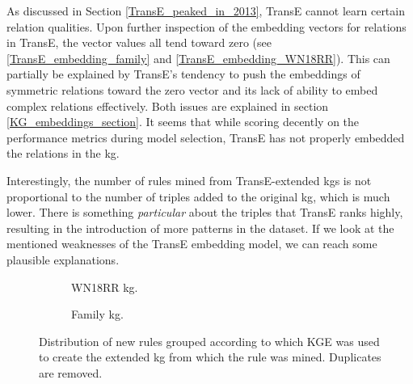 As discussed in Section \ref{TransE_peaked_in_2013}, TransE cannot learn certain relation qualities. Upon further inspection of the embedding vectors for relations in TransE, the vector values all tend toward zero (see \ref{TransE_embedding_family} and \ref{TransE_embedding_WN18RR}). This can partially be explained by TransE's tendency to push the embeddings of symmetric relations toward the zero vector and its lack of ability to embed complex relations effectively. Both issues are explained in section \ref{KG_embeddings_section}. It seems that while scoring decently on the performance metrics during model selection, TransE has not properly embedded the relations in the \gls{kg}. 

Interestingly, the number of rules mined from TransE-extended \glspl{kg} is not proportional to the number of triples added to the original \gls{kg}, which is much lower. There is something \textit{particular} about the triples that TransE ranks highly, resulting in the introduction of more patterns in the dataset. If we look at the mentioned weaknesses of the TransE embedding model, we can reach some plausible explanations.

\begin{figure}[htb]
\centering
\begin{subfigure}{.5\textwidth}
  \centering
  
  \caption{WN18RR \gls{kg}.}
  \label{venn_wn18rr}
\end{subfigure}%
\begin{subfigure}{.5\textwidth}
  \centering
  
  \caption{Family \gls{kg}.}
  \label{venn_family}
\end{subfigure}
\caption[New rules grouped by KGEs]{Distribution of new rules grouped according to which KGE was used to create the extended \gls{kg} from which the rule was mined. Duplicates are removed.}
\label{venn}
\end{figure}

